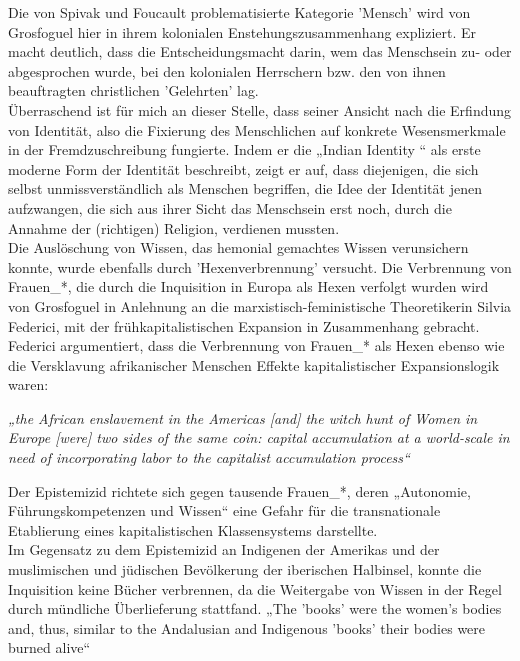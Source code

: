 \noindent Die von Spivak und Foucault
problematisierte Kategorie 'Mensch' wird von Grosfoguel hier in ihrem
kolonialen Enstehungszusammenhang expliziert. Er macht deutlich, dass die
Entscheidungsmacht darin, wem das Menschsein zu- oder abgesprochen wurde, bei
den kolonialen Herrschern bzw. den von ihnen beauftragten christlichen
'Gelehrten' lag. \\
Überraschend ist für mich an dieser Stelle, dass seiner
Ansicht nach die Erfindung von Identität, also die Fixierung des Menschlichen
auf konkrete Wesensmerkmale in der Fremdzuschreibung fungierte. Indem er die
„Indian Identity “ als erste moderne Form der Identität beschreibt, zeigt er
auf, dass diejenigen, die sich selbst unmissverständlich als Menschen
begriffen, die Idee der Identität jenen aufzwangen, die sich aus ihrer Sicht
das Menschsein erst noch, durch die Annahme der (richtigen) Religion, verdienen
mussten.\\

\noindent Die Auslöschung von Wissen, das hemonial gemachtes Wissen verunsichern konnte,
wurde ebenfalls durch 'Hexenverbrennung'  versucht. Die Verbrennung von
Frauen\_*, die durch die Inquisition in Europa als Hexen verfolgt wurden wird
von Grosfoguel in Anlehnung an die marxistisch-feministische Theoretikerin
Silvia Federici, mit der frühkapitalistischen Expansion in Zusammenhang
gebracht. Federici argumentiert, dass die Verbrennung von Frauen\_* als Hexen ebenso wie die Versklavung afrikanischer Menschen Effekte kapitalistischer Expansionslogik waren:  
\begin{myenv}
  \textit{„the African enslavement in the Americas [and] the witch hunt of
    Women in Europe [were] two sides of the same coin: capital accumulation at a
    world-scale in need of incorporating labor to the capitalist accumulation
  process“\footnotemark {} }
\end{myenv}
Der Epistemizid richtete sich gegen tausende Frauen\_*, deren „Autonomie,
Führungskompetenzen und Wissen“ \footnotemark {} 
eine Gefahr für die transnationale Etablierung
eines kapitalistischen Klassensystems darstellte.\\
Im Gegensatz zu dem Epistemizid an Indigenen der Amerikas und der muslimischen
und jüdischen Bevölkerung der iberischen Halbinsel, konnte die Inquisition
keine Bücher verbrennen, da die Weitergabe von Wissen in der Regel durch
mündliche Überlieferung stattfand. „The 'books' were the women’s bodies and,
thus, similar to the Andalusian and Indigenous 'books' their bodies were burned
alive“\footnotemark {}\\

